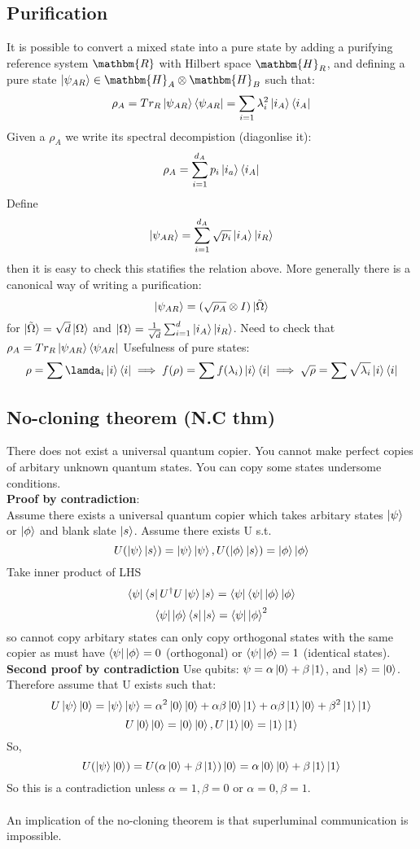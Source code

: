 \documentclass{article}
\begin{document}
\subsection{Purification}
It is possible to convert a mixed state into a pure state by adding a purifying reference system $\mathbm{R}$ with Hilbert space $\mathbm{H}_R$, and defining a pure state $\ket{\psi_{AR}} \in \mathbm{H}_A \otimes \mathbm{H}_B$ such that:
$$
\rho_A = Tr_R \ket{\psi_{AR}}\bra{\psi_{AR}} = \sum_{i=1}\lambda_i^2 \ket{i_A}\bra{i_A}
$$
Given a $\rho_A$ we write its spectral decompistion (diagonlise it): 
$$
\rho_A = \sum^{d_A}_{i=1} p_i \ket{i_a} \bra{i_A}
$$
Define
$$
\ket{\psi_{AR}} = \sum_{i=1}^{d_A} \sqrt{p_i} \ket{i_A} \ket{i_R}
$$
then it is easy to check this statifies the relation above. More generally there is a canonical way of writing a purification:
$$
\ket{\psi_{AR}} = (\sqrt{\rho_A} \otimes I) \ket{\tilde \Omega} 
$$
for $\ket{\tilde \Omega} = \sqrt{d} \ket{\Omega}$ and $\ket{\Omega} = \frac{1}{\sqrt{d}} \sum_{i=1}^{d} \ket{i_A}\ket{i_R}$. Need to check that $\rho_A = Tr_R \ket{\psi_{AR}}\bra{\psi_{AR}} $
Usefulness of pure states:
$$
\rho = \sum \lamda_i \ket{i} \bra{i} \implies f(\rho) = \sum f(\lambda_i) \ket{i} \bra{i} \implies \sqrt{\rho} = \sum \sqrt{\lambda_i} \ket{i}\bra{i}
$$
\subsection{No-cloning theorem (N.C thm)}
There does not exist a universal quantum copier. You cannot make perfect copies of arbitary unknown quantum states. You can copy some states undersome conditions. \\
\textbf{Proof by contradiction}:\\
Assume there exists a universal quantum copier which takes arbitary states $\ket{\psi}$ or $\ket{\phi}$ and blank slate $\ket{s}$. Assume there exists U s.t.
$$
U(\ket{\psi}\ket{s}) = \ket{\psi}\ket{\psi}, U(\ket{\phi}\ket{s}) = \ket{\phi}\ket{\phi}
$$
Take inner product of LHS
$$
\bra{\psi} \bra{s} U^{\dagger} U \ket{\psi} \ket{s} = \bra{\psi} \bra{\psi} \ket{\phi} \ket{\phi}
$$
$$
\bra{\psi} \ket{\phi} \bra{s} \ket{s} = \bra{\psi}\ket{\phi}^2
$$
so cannot copy arbitary states can only copy orthogonal states with the same copier as must have $\bra{\psi}\ket{\phi} = 0$ (orthogonal) or $\bra{\psi}\ket{\phi} = 1$ (identical states).\\
\textbf{Second proof by contradiction}
Use qubits: $\psi = \alpha \ket{0} + \beta \ket{1}$, and $\ket{s} = \ket{0}$. Therefore assume that U exists such that:
$$
U\ket{\psi}\ket{0} = \ket{\psi}\ket{\psi} = \alpha^2 \ket{0} \ket{0} + \alpha \beta\ket{0} \ket{1} + \alpha \beta \ket{1} \ket{0} + \beta^2 \ket{1} \ket{1}
$$
$$
U\ket{0}\ket{0} = \ket{0}\ket{0}, U\ket{1}\ket{0} = \ket{1}\ket{1}
$$
So,
$$
U(\ket{\psi}\ket{0}) = U(\alpha \ket{0} + \beta \ket{1}) \ket{0} = \alpha \ket{0} \ket{0} + \beta \ket{1} \ket{1}
$$
So this is a contradiction unless $\alpha=1, \beta = 0$ or $\alpha =0, \beta =1$.\\\\
An implication of the no-cloning theorem is that superluminal communication is impossible.
\end{document}

